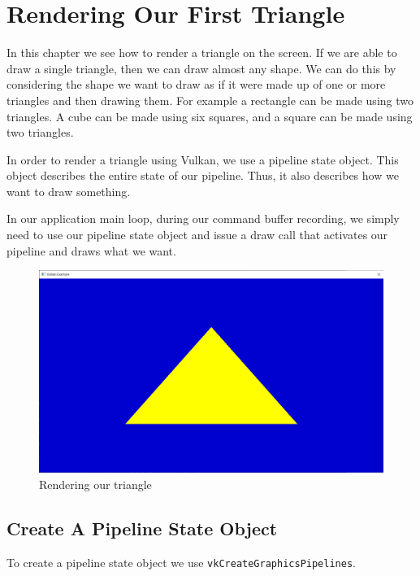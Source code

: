 \chapter{Rendering Our First Triangle}
\label{chap:Triangle}

In this chapter we see how to render a triangle on the screen.
If we are able to draw a single triangle, then we can draw almost any shape.
We can do this by considering the shape we want to draw as if it were
made up of one or more triangles and then drawing them.
For example a rectangle can be made using two triangles.
A cube can be made using six squares, and a square can be made using two
triangles.

In order to render a triangle using Vulkan, we use a pipeline state object.
This object describes the entire state of our pipeline.
Thus, it also describes how we want to draw something.

In our application main loop, during our command buffer recording, we
simply need to use our pipeline state object and issue a draw call that activates
our pipeline and draws what we want.

\begin{figure}[ht]
    \centering
    \includegraphics[scale=0.20]{images/ChTriangle/Triangle.png}
    \caption{Rendering our triangle}
    \label{fig::RenderTriangle}
\end{figure}

\section{Create A Pipeline State Object}

To create a pipeline state object we use \texttt{vkCreateGraphicsPipelines}.

\begin{minipage}{\linewidth}{\noindent}
    
\end{minipage}

